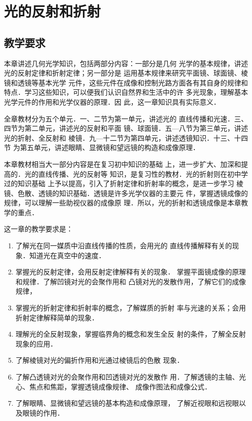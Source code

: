 \chapter{光的反射和折射}
\minitoc[n]
\section{教学要求}
    本章讲述几何光学知识，包括两部分内容：一部分是几何
光学的基本规律，讲述光的反射定律和折射定律；另一部分是
运用基本规律来研究平面镜、球面镜、棱镜和透镜等基本光学
元件，这些元件在成像和控制光路方面各有其自身的规律和
特点．学习这些知识，可以便我们认识自然界和生活中的许
多光现象，理解基本光学元件的作用和光学仪器的原理．因
此，这一章知识具有实际意义．

全章教材分为五个单元．一、二节为第一单元，讲述光的
直线传播和光速．三、四节为第二单元，讲述光的反射和平面
镜、球面镜．五—八节为第三单元，讲述光的折射、全反射和
棱镜．九—十二节为第四单元，讲述透镜知识．十三、十四节
为第五单元，讲述眼睛、显微镜和望远镜的构造和成像原理．

本章教材相当大一部分内容是在复习初中知识的基础
上，进一步扩大、加深和提高的．光的直线传播、光的反射等
知识，是复习性的教材．光的折射则在初中学过的知识基础
上予以提高，引入了折射定律和折射率的概念，是进一步学习
棱镜、色散、透镜的知识基础．透镜是许多光学仪器的主要元
件，掌握透镜成像的规律，可以理解一些助视仪器的成像原
理．所以，光的折射和透镜成像是本章教学的重点．

这一章的教学要求是：
\begin{enumerate}
\item 了解光在同一媒质中沿直线传播的性质，会用光的
直线传播解释有关的现象．知道光在真空中的速度．
\item 掌握光的反射定律，会用反射定律解释有关的现象．
掌握平面镜成像的原理和规律．了解凹镜对光的会聚作用和
凸镜对光的发散作用，了解它们的成像规律，
\item 掌握光的折射定律和折射率的概念，了解媒质的折射
率与光速的关系；会用折射定律解释简单的现象．
\item 理解光的全反射现象，掌握临界角的概念和发生全反
射的条件，了解全反射现象的应用．
\item 了解棱镜对光的偏折作用和光通过棱镜后的色散
现象．
\item 了解凸透镜对光的会聚作用和凹透镜对光的发散作
用．了解透镜的主轴、光心、焦点和焦距，掌握透镜成像规律、
成像作图法和成像公式．
\item 了解眼睛、显微镜和望远镜的基本构造和成像原理，
了解近视眼和远视眼以及眼镜的作用．
\end{enumerate}

